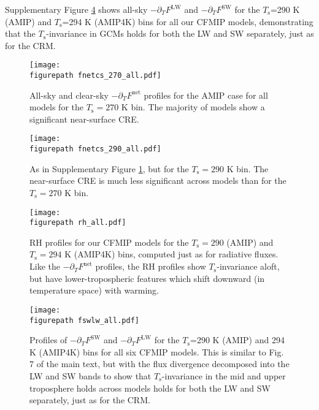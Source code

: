 \documentclass[11pt]{article}
\newcommand{\ppt}{\ensuremath{\partial_T}}
\newcommand{\FLW}{\ensuremath{F^\mathrm{LW}}}
\newcommand{\FSW}{\ensuremath{F^\mathrm{SW}}}
\newcommand{\Fnet}{\ensuremath{F^\mathrm{net}}}
\newcommand{\Ts}{\ensuremath{T_\mathrm{s}}}
\newcommand{\figurepath}{../../figures/}
\begin{document}
 Supplementary Figure \ref{fswlw_all} shows  all-sky $-\ppt \FLW$ and $-\ppt \FSW$ for the \Ts=290 K (AMIP) and \Ts=294 K (AMIP4K) bins for all our CFMIP models, demonstrating that the \Ts-invariance in GCMs holds for both the LW and SW separately, just as for the CRM.
 
\begin{figure}[h]
        \begin{center}
                        \texttt{[image: \\figurepath fnetcs\_270\_all.pdf]}
                \caption{All-sky and clear-sky $-\ppt\Fnet$ profiles for the AMIP case for all models for the $\Ts=270$ K bin. The majority of models show a significant near-surface CRE.
                                \label{fnetcs_270_all}
                }
        \end{center}
\end{figure}

\begin{figure}[h]
        \begin{center}
                        \texttt{[image: \\figurepath fnetcs\_290\_all.pdf]}
                \caption{As in Supplementary Figure \ref{fnetcs_270_all},  but for the $\Ts= 290$ K bin. The near-surface CRE is much less significant across models than for the $\Ts= 270$ K bin.
                                \label{fnetcs_290_all}
                }
        \end{center}
\end{figure}

\begin{figure}[h]
        \begin{center}
                        \texttt{[image: \\figurepath rh\_all.pdf]}
                \caption{RH profiles for our CFMIP models for the $\Ts=290$ (AMIP) and  $\Ts= 294$ K (AMIP4K) bins, computed just as for radiative fluxes. Like the $-\ppt\Fnet$ profiles, the RH profiles show \Ts-invariance aloft, but have lower-tropospheric features which shift downward (in temperature space) with warming.
                                \label{rh_all}
                }
        \end{center}
\end{figure}

\begin{figure}[h!]
	\begin{center}
			\texttt{[image: \\figurepath fswlw\_all.pdf]}
		\caption{ Profiles of $-\ppt \FSW$ and $-\ppt \FLW$ for the \Ts=290 K (AMIP) and 294 K (AMIP4K) bins for all six CFMIP models. This is similar to Fig. 7 of the main text, but with the flux divergence decomposed into the LW and SW bands to show  that \Ts-invariance in the mid and upper troposphere holds across models holds for both the LW and SW separately, just as for the CRM. 
		\label{fswlw_all}
		}
	\end{center}
\end{figure}
\end{document}
